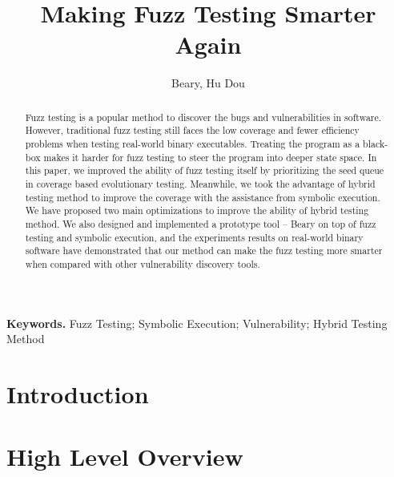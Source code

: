 \documentclass[a4paper]{article}
\begin{document}
\title{Making Fuzz Testing Smarter Again}
\author{Beary, Hu Dou}
\maketitle

\begin{abstract}

Fuzz testing is a popular method to discover the bugs and vulnerabilities in software. However, traditional fuzz testing still faces the low coverage and fewer efficiency problems when testing real-world binary executables. Treating the program as a black-box makes it harder for fuzz testing to steer the program into deeper state space. In this paper, we improved the ability of fuzz testing itself by prioritizing the seed queue in coverage based evolutionary testing. Meanwhile, we took the advantage of hybrid testing method to improve the coverage with the assistance from symbolic execution. We have proposed two main optimizations to improve the ability of hybrid testing method. We also designed and implemented a prototype tool -- Beary on top of fuzz testing and symbolic execution, and the experiments results on real-world binary software have demonstrated that our method can make the fuzz testing more smarter when compared with other vulnerability discovery tools.

\end{abstract}
\textbf{Keywords.} Fuzz Testing; Symbolic Execution; Vulnerability; Hybrid Testing Method

\section{Introduction}


\section{High Level Overview}

\end{document}
